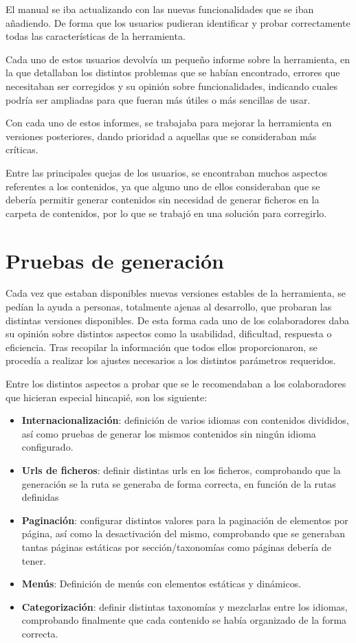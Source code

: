 El manual se iba actualizando con las nuevas funcionalidades que se iban añadiendo. De forma que
los usuarios pudieran identificar y probar correctamente todas las características de la herramienta.

Cada uno de estos usuarios devolvía un pequeño informe sobre la herramienta, en la que detallaban los distintos
problemas que se habían encontrado, errores que necesitaban ser corregidos y su opinión sobre
funcionalidades, indicando cuales podría ser ampliadas para que fueran más útiles o más sencillas de usar.

Con cada uno de estos informes, se trabajaba para mejorar la herramienta en versiones posteriores, dando
prioridad a aquellas que se consideraban más críticas.

Entre las principales quejas de los usuarios, se encontraban muchos aspectos referentes a los contenidos,
ya que alguno uno de ellos consideraban que se debería permitir generar contenidos sin necesidad 
de generar ficheros en la carpeta de contenidos, por lo que se trabajó en una solución para corregirlo.

\section{Pruebas de generación}

Cada vez que estaban disponibles nuevas versiones estables de la herramienta, se pedían la ayuda a personas,
totalmente ajenas al desarrollo, que probaran las distintas versiones disponibles. De esta forma cada uno
de los colaboradores daba su opinión sobre  distintos aspectos como la usabilidad, dificultad, respuesta o eficiencia.
Tras recopilar la información que todos ellos proporcionaron, se procedía a realizar los ajustes
necesarios a los distintos parámetros requeridos.

Entre los distintos aspectos a probar que se le recomendaban a los
colaboradores que hicieran especial hincapié, son los siguiente:

\begin{itemize}
\item \textbf{Internacionalización}: definición de varios idiomas con contenidos divididos, así como pruebas de generar
los mismos contenidos sin ningún idioma configurado.
\item \textbf{Urls de ficheros}: definir distintas urls en los ficheros, comprobando que la generación se la ruta
se generaba de forma correcta, en función de la rutas definidas
\item \textbf{Paginación}: configurar distintos valores para la paginación de elementos por página, así como la desactivación
del mismo, comprobando que se generaban tantas páginas estáticas por sección/taxonomías como páginas debería de tener.
\item \textbf{Menús}: Definición de menús con elementos estáticas y dinámicos.
\item \textbf{Categorización}: definir distintas taxonomías y mezclarlas entre los idiomas, comprobando finalmente que cada
contenido se había organizado de la forma correcta.
\end{itemize}

